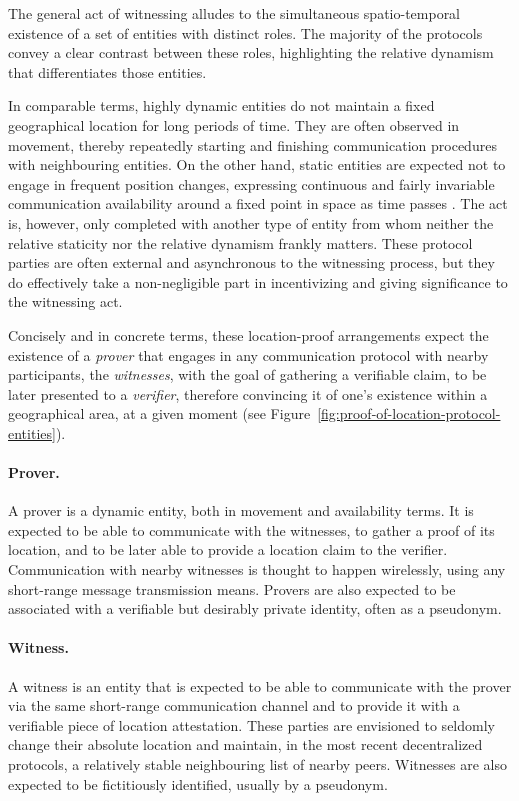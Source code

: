 The general act of witnessing alludes to the simultaneous spatio-temporal existence of a set of entities with distinct roles. The majority of the protocols convey a clear contrast between these roles, highlighting the relative dynamism that differentiates those entities. 

In comparable terms, highly dynamic entities do not maintain a fixed geographical location for long periods of time. They are often observed in movement, thereby repeatedly starting and finishing communication procedures with neighbouring entities. On the other hand, static entities are expected not to engage in frequent position changes, expressing continuous and fairly invariable communication availability around a fixed point in space as time passes \cite{nasrulin2018robust}. The act is, however, only completed with another type of entity from whom neither the relative staticity nor the relative dynamism frankly matters. These protocol parties are often external and asynchronous to the witnessing process, but they do effectively take a non-negligible part in incentivizing and giving significance to the witnessing act. 

Concisely and in concrete terms, these location-proof arrangements expect the existence of a \emph{prover} that engages in any communication protocol with nearby participants, the \emph{witnesses}, with the goal of gathering a verifiable \pol{} claim, to be later presented to a \emph{verifier}, therefore convincing it of one's existence within a geographical area, at a given moment \cite{dupin2018location} (see Figure~\ref{fig:proof-of-location-protocol-entities}).

\paragraph{Prover.} A prover is a dynamic entity, both in movement and availability terms. It is expected to be able to communicate with the witnesses, to gather a proof of its location, and to be later able to provide a location claim to the verifier. Communication with nearby witnesses is thought to happen wirelessly, using any short-range message transmission means. Provers are also expected to be associated with a verifiable but desirably private identity, often as a pseudonym.

\paragraph{Witness.} A witness is an entity that is expected to be able to communicate with the prover via the same short-range communication channel and to provide it with a verifiable piece of location attestation. These parties are envisioned to seldomly change their absolute location and maintain, in the most recent decentralized protocols, a relatively stable neighbouring list of nearby peers. Witnesses are also expected to be fictitiously identified, usually by a pseudonym.

